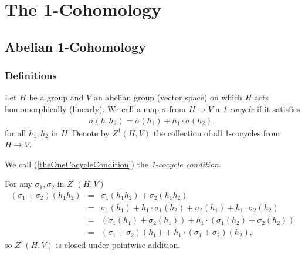 
\chapter{The 1-Cohomology}
\label{Chapter3}

\section{Abelian 1-Cohomology}
	
\subsection{Definitions}
Let $H$ be a group and $V$ an abelian group (vector space) on which $H$ acts homomorphically (linearly). We call a map $\sigma$ from $H\rightarrow V$ a  \emph{1-cocycle} if it satisfies
\begin{eqnarray}\label{theOneCocycleCondition}
	\sigma(h_1h_2) = \sigma(h_1) + h_1\cdot\sigma(h_2),
\end{eqnarray}
for all $h_1, h_2$ in $H$. Denote by $Z^1\left( H, V \right)$ the collection of all 1-cocycles from $H\rightarrow V$.

We call (\ref{theOneCocycleCondition}) the \emph{1-cocycle condition}.

For any $\sigma_1, \sigma_2$ in $Z^1\left(H, V\right)$
\begin{eqnarray*}
	\left(\sigma_1 + \sigma_2\right)(h_1h_2) &=& \sigma_1(h_1h_2) +  \sigma_2(h_1h_2) \\
	&=& \sigma_1(h_1) + h_1\cdot\sigma_1(h_2) +  \sigma_2(h_1) + h_1\cdot\sigma_2(h_2)\\
	&=& \left( \sigma_1(h_1) + \sigma_2(h_1) \right) + h_1\cdot\left(\sigma_1(h_2) + \sigma_2(h_2)\right) \\
	&=& \left(\sigma_1+\sigma_2\right)(h_1) + h_1\cdot\left(\sigma_1 + \sigma_2\right)(h_2),
\end{eqnarray*}
so $Z^1(H, V)$ is closed under pointwise addition.

